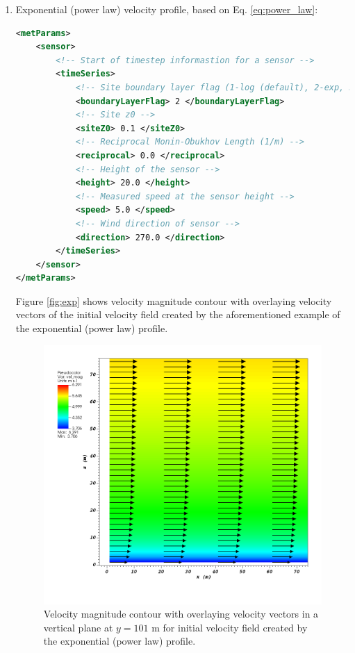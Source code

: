\begin{enumerate}
\item Exponential (power law) velocity profile, based on Eq. \ref{eq:power_law}:

\begin{lstlisting}[language=XML]
<metParams>
	<sensor>
		<!-- Start of timestep informastion for a sensor -->	
		<timeSeries>
			<!-- Site boundary layer flag (1-log (default), 2-exp, 3-urban canopy, 4-data entry) -->						
			<boundaryLayerFlag> 2 </boundaryLayerFlag> 
			<!-- Site z0 -->
			<siteZ0> 0.1 </siteZ0> 					
			<!-- Reciprocal Monin-Obukhov Length (1/m) -->			
			<reciprocal> 0.0 </reciprocal> 				
			<!-- Height of the sensor -->			
			<height> 20.0 </height> 				
			<!-- Measured speed at the sensor height -->			
			<speed> 5.0 </speed> 					
			<!-- Wind direction of sensor -->			
			<direction> 270.0 </direction> 				
		</timeSeries>
	</sensor>
</metParams>
\end{lstlisting}

Figure \ref{fig:exp} shows velocity magnitude contour with overlaying  velocity vectors of the initial velocity field created by the aforementioned example of the exponential (power law) profile.

\begin{figure}[H]
\includegraphics[width=\textwidth,keepaspectratio]{Images/exp_y_101.png}
\caption{Velocity magnitude contour with overlaying velocity vectors in a vertical plane at $y=101$ m for initial velocity field created by the exponential (power law) profile.}
\end{figure}
\noindent



\end{enumerate}
